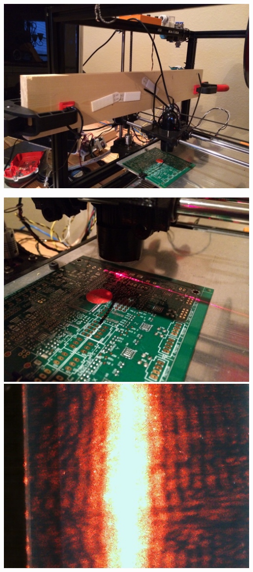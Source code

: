 \documentclass[12pt]{article}
\begin{document}
\includegraphics[scale=0.1,angle=270]{images/volume_analysis_setup/IMG_0614.JPG}

\includegraphics[scale=0.1]{images/volume_analysis_setup/IMG_0606.JPG}
\includegraphics[scale=0.5]{images/volume_analysis_setup/laser-8}
\end{document}
